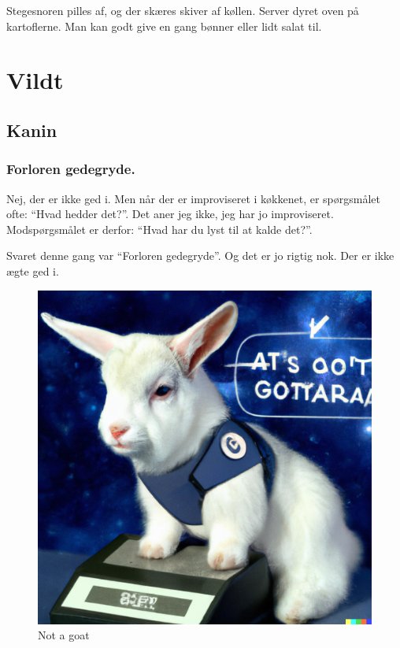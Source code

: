 \documentclass[
]{book}
\begin{document}
Stegesnoren pilles af, og der skæres skiver af køllen. Server dyret oven på kartoflerne. Man kan godt give en gang bønner eller lidt salat til.

\hypertarget{vildt}{%
\chapter{Vildt}\label{vildt}}

\hypertarget{kanin}{%
\section{Kanin}\label{kanin}}

\hypertarget{forloren-gedegryde.}{%
\subsection{Forloren gedegryde.}\label{forloren-gedegryde.}}

Nej, der er ikke ged i. Men når der er improviseret i køkkenet, er spørgsmålet
ofte: ``Hvad hedder det?''. Det aner jeg ikke, jeg har jo improviseret.
Modspørgsmålet er derfor: ``Hvad har du lyst til at kalde det?''.

Svaret denne gang var ``Forloren gedegryde''. Og det er jo rigtig nok. Der er ikke
ægte ged i.

\begin{figure}
\centering
\includegraphics{images/DALL-E-notagoat.png}
\caption{Not a goat}
\end{figure}
\end{document}
